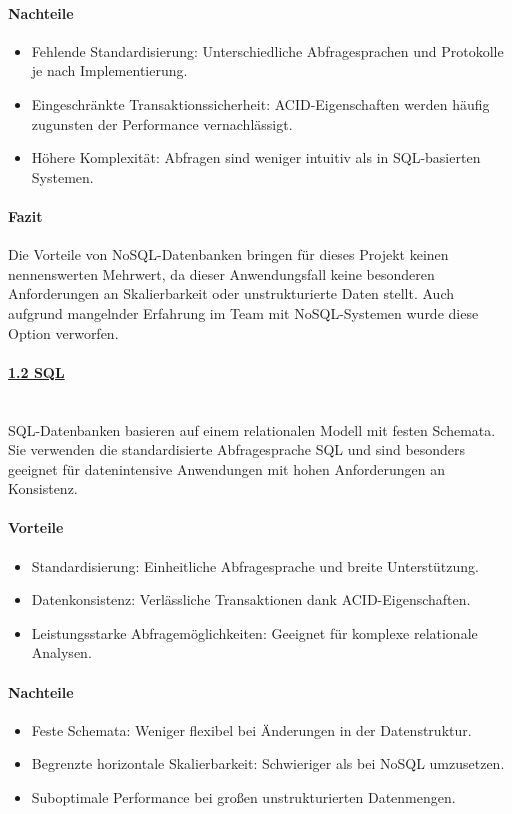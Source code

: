 \documentclass[a4paper,12pt]{report}
\begin{document}
    \paragraph{Nachteile}
    \begin{itemize}
        \item Fehlende Standardisierung: Unterschiedliche Abfragesprachen und Protokolle je nach Implementierung.
        \item Eingeschränkte Transaktionssicherheit: ACID-Eigenschaften werden häufig zugunsten der Performance vernachlässigt.
        \item Höhere Komplexität: Abfragen sind weniger intuitiv als in SQL-basierten Systemen.
    \end{itemize}

    \paragraph{Fazit}
    Die Vorteile von NoSQL-Datenbanken bringen für dieses Projekt keinen nennenswerten Mehrwert, da dieser Anwendungsfall keine besonderen Anforderungen an Skalierbarkeit oder unstrukturierte Daten stellt.
    Auch aufgrund mangelnder Erfahrung im Team mit NoSQL-Systemen wurde diese Option verworfen.

    \paragraph{\underline{1.2 SQL}}\mbox{}\\
    SQL-Datenbanken basieren auf einem relationalen Modell mit festen Schemata.
    Sie verwenden die standardisierte Abfragesprache SQL und sind besonders geeignet für datenintensive Anwendungen mit hohen Anforderungen an Konsistenz.

    \paragraph{Vorteile}
    \begin{itemize}
        \item Standardisierung: Einheitliche Abfragesprache und breite Unterstützung.
        \item Datenkonsistenz: Verlässliche Transaktionen dank ACID-Eigenschaften.
        \item Leistungsstarke Abfragemöglichkeiten: Geeignet für komplexe relationale Analysen.
    \end{itemize}

    \paragraph{Nachteile}
    \begin{itemize}
        \item Feste Schemata: Weniger flexibel bei Änderungen in der Datenstruktur.
        \item Begrenzte horizontale Skalierbarkeit: Schwieriger als bei NoSQL umzusetzen.
        \item Suboptimale Performance bei großen unstrukturierten Datenmengen.
    \end{itemize}
\end{document}
